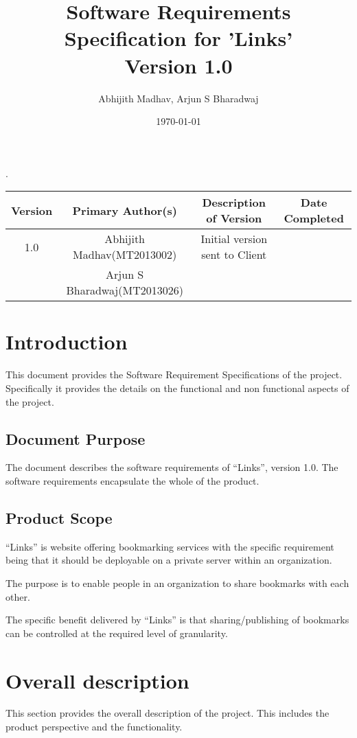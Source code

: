 \documentclass[11pt]{report} %
\title{Software Requirements Specification for 'Links' \\ Version 1.0}
\author{Abhijith Madhav, Arjun S Bharadwaj}
\begin{document}
\maketitle
{ }
. \\
\begin{tabular}{ | c | c | c | c | }
\hline            
  Version & Primary Author(s) & Description of Version  & Date Completed\\
  \hline  
  \hline  
  1.0 & Abhijith Madhav(MT2013002) & Initial version sent to Client & \date{\today} \\
   & Arjun S Bharadwaj(MT2013026) & & \\
\hline  
\end{tabular}
\tableofcontents
\chapter{Introduction}
This document provides the Software Requirement Specifications of the project. Specifically it provides the details on the functional and non functional aspects of the project.
\section{Document Purpose}
The document describes the software requirements of “Links”, version 1.0. The software requirements encapsulate the whole of the product.

\section{Product Scope}
“Links” is website offering bookmarking services with the specific requirement being that it should be deployable on a private server within an organization.

The purpose is to enable people in an organization to share bookmarks with each other.

The specific benefit delivered by “Links” is that sharing/publishing of bookmarks can be controlled at the required level of granularity.


\maketitle
\chapter{Overall description}
This section provides the overall description of the project. This includes the product perspective and the functionality.
\end{document}
